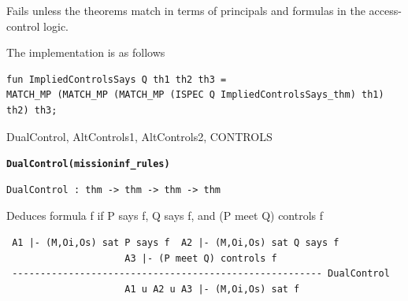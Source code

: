 \documentclass[10pt,twoside]{article}
\begin{document}
\FAILURE
Fails unless the theorems match in terms of principals and formulas
in the access-control logic.


\IMPLEMENTATION
The implementation is as follows
\begin{holboxed}
\begin{verbatim}
fun ImpliedControlsSays Q th1 th2 th3 =
MATCH_MP (MATCH_MP (MATCH_MP (ISPEC Q ImpliedControlsSays_thm) th1) th2) th3;
\end{verbatim}
\end{holboxed}

\SEEALSO
DualControl, AltControls1, AltControls2, CONTROLS
\ENDDOC

\begin{holboxed}
  \begin{Large}
    \texttt{\textbf{DualControl}}\hfill{}\texttt{\textbf{(missioninf\_rules)}}
  \end{Large}
\end{holboxed}

\begin{verbatim}
DualControl : thm -> thm -> thm -> thm
\end{verbatim}

\SYNOPSIS 
Deduces formula f if P says f, Q says f, and (P meet Q) controls f

\DESCRIBE

\begin{scriptsize}
\begin{verbatim}
 A1 |- (M,Oi,Os) sat P says f  A2 |- (M,Oi,Os) sat Q says f
                     A3 |- (P meet Q) controls f
 ------------------------------------------------------- DualControl
                     A1 u A2 u A3 |- (M,Oi,Os) sat f
\end{verbatim}
\end{scriptsize}
\end{document}
